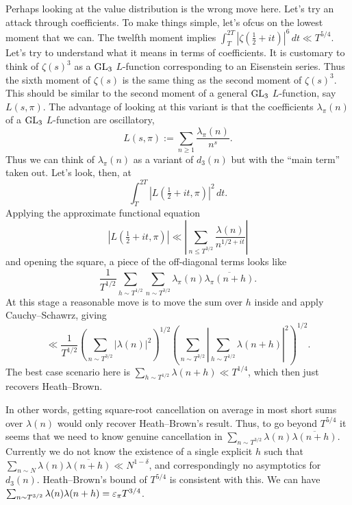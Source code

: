 \documentclass[reqno]{amsart} 
\numberwithin{theorem}{section}
\numberwithin{equation}{section}
\begin{document}
Perhaps looking at the value distribution is the wrong move here.  Let's try an attack through coefficients.  To make things simple, let's ofcus on the lowest moment that we can.  The twelfth moment implies $\int_{T}^{2 T} \left\lvert \zeta(\tfrac{1}{2} + i t) \right\rvert^6 \, d t \ll T^{5/4}$.  Let's try to understand what it means in terms of coefficients.  It is customary to think of $\zeta(s)^3$ as a $\operatorname{GL}_3$ $L$-function corresponding to an Eisenstein series.  Thus the sixth moment of $\zeta(s)$ is the same thing as the second moment of $\zeta(s)^3$.  This should be similar to the second moment of a general $\operatorname{GL}_3$ $L$-function, say $L(s, \pi)$.  The advantage of looking at this variant is that the coefficients $\lambda_\pi(n)$ of a $\operatorname{GL}_3$ $L$-function are oscillatory,
\begin{equation*}
  L(s, \pi) := \sum_{n \geq 1} \frac{\lambda_\pi(n)}{n^s}.
\end{equation*}
Thus we can think of $\lambda_\pi(n)$ as a variant of $d_3(n)$ but with the ``main term'' taken out.  Let's look, then, at
\begin{equation*}
  \int_{T}^{2 T} \left\lvert L(\tfrac{1}{2} + i t, \pi) \right\rvert^2 \, d t.
\end{equation*}
Applying the approximate functional equation
\begin{equation*}
  \left\lvert L(\tfrac{1}{2} + i t, \pi) \right\rvert \ll \left\lvert \sum_{n \leq T^{3/2}} \frac{\lambda(n)}{n^{1/2 + i t}} \right\rvert
\end{equation*}
and opening the square, a piece of the off-diagonal terms looks like
\begin{equation*}
  \frac{1}{T^{1/2}} \sum_{h \sim T^{1/2}} \sum_{n \sim T^{3/2}} \lambda_\pi(n) \overline{\lambda_\pi(n + h)}.
\end{equation*}
At this stage a reasonable move is to move the sum over $h$ inside and apply Cauchy--Schawrz, giving
\begin{equation*}
  \ll \frac{1}{T^{1/2}} \left( \sum_{n \sim T^{3/2}} \left\lvert \lambda(n) \right\rvert^2 \right)^{1/2}
  \left( \sum_{n \sim T^{3/2}} \left\lvert \sum_{h \sim T^{1/2}} \lambda(n + h) \right\rvert^2 \right)^{1/2}.
\end{equation*}
The best case scenario here is $\sum_{h \sim T^{1/2}} \lambda(n + h) \ll T^{1/4}$, which then just recovers Heath--Brown.

In other words, getting square-root cancellation on average in most short sums over $\lambda(n)$ would only recover Heath--Brown's result.  Thus, to go beyond $T^{5/4}$ it seems that we need to know genuine cancellation in $\sum_{n \sim T^{3/2}} \lambda(n) \overline{\lambda(n + h)}$.  Currently we do not know the existence of a single explicit $h$ such that $\sum_{n \sim N} \lambda(n) \overline{\lambda(n + h)} \ll N^{1 - \delta}$, and correspondingly no asymptotics for $d_3(n)$.  Heath--Brown's bound of $T^{5/4}$ is consistent with this.  We can have $\sum_{n \sim T^{3/2}} \lambda(n) \lambda(n + h) = \varepsilon_\pi T^{3/4}$.
\end{document}
